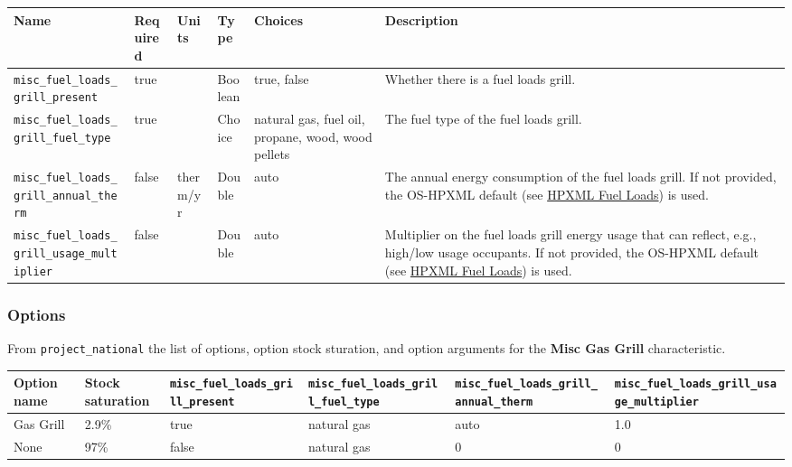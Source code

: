 \begin{longtable}[]{@{}llllll@{}}
\toprule\noalign{}
Name & Required & Units & Type & Choices & Description \\
\midrule\noalign{}
\endhead
\bottomrule\noalign{}
\endlastfoot
\texttt{misc\_fuel\_loads\_grill\_present} & true & & Boolean & true,
false & Whether there is a fuel loads grill. \\
\texttt{misc\_fuel\_loads\_grill\_fuel\_type} & true & & Choice &
natural gas, fuel oil, propane, wood, wood pellets & The fuel type of
the fuel loads grill. \\
\texttt{misc\_fuel\_loads\_grill\_annual\_therm} & false & therm/yr &
Double & auto & The annual energy consumption of the fuel loads grill.
If not provided, the OS-HPXML default (see
\href{https://openstudio-hpxml.readthedocs.io/en/v1.7.0/workflow_inputs.html\#hpxml-fuel-loads}{HPXML
Fuel Loads}) is used. \\
\texttt{misc\_fuel\_loads\_grill\_usage\_multiplier} & false & & Double
& auto & Multiplier on the fuel loads grill energy usage that can
reflect, e.g., high/low usage occupants. If not provided, the OS-HPXML
default (see
\href{https://openstudio-hpxml.readthedocs.io/en/v1.7.0/workflow_inputs.html\#hpxml-fuel-loads}{HPXML
Fuel Loads}) is used. \\
\end{longtable}

\subsubsection{Options}\label{options-117}

From \texttt{project\_national} the list of options, option stock
sturation, and option arguments for the \textbf{Misc Gas Grill}
characteristic.

\begin{longtable}[]{@{}llllll@{}}
\toprule\noalign{}
Option name & Stock saturation &
\texttt{misc\_fuel\_loads\_grill\_present} &
\texttt{misc\_fuel\_loads\_grill\_fuel\_type} &
\texttt{misc\_fuel\_loads\_grill\_annual\_therm} &
\texttt{misc\_fuel\_loads\_grill\_usage\_multiplier} \\
\midrule\noalign{}
\endhead
\bottomrule\noalign{}
\endlastfoot
Gas Grill & 2.9\% & true & natural gas & auto & 1.0 \\
None & 97\% & false & natural gas & 0 & 0 \\
\end{longtable}



